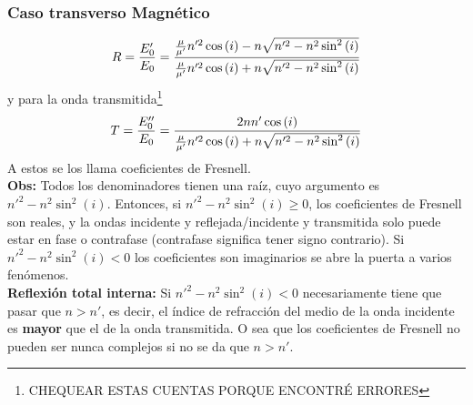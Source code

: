 \subsubsection*{Caso transverso Magnético}
\begin{equation}
    R 
    =
    \frac{E_{0}'}{E_{0}} 
    =
    \frac%
    {%
        \frac{\mu}{\mu'}n'^{2}\cos{(i)}
        -
        n\sqrt{n'^2- n^2 \sin^{2}{(i)}}
    }
    {%
        \frac{\mu}{\mu'}
        n'^{2}\cos{(i)}
        +
        n\sqrt{n'^{2} - n^{2} \sin^{2}{(i)}}
    }
        \label{ec:RTM}
\end{equation}
y para la onda transmitida\footnote{CHEQUEAR ESTAS CUENTAS PORQUE ENCONTRÉ ERRORES}
\begin{equation}
    T
    =
    \frac{E_{0}''}{E_{0}} 
    =
    \frac%
    {%
        2nn'\cos{(i)}
    }
    {%
        \frac{\mu}{\mu'}
        n'^{2}\cos{(i)}
        +
        n\sqrt{n'^{2} - n^{2} \sin^{2}{(i)}}
    }
        \label{ec:TTM}
\end{equation}
A estos se los llama coeficientes de Fresnell.\\
\indent \textbf{Obs:} Todos los denominadores tienen una raíz, cuyo argumento es $n'^{2} - n^{2}\sin^{2}{(i)}$. Entonces, si $n'^{2} - n^{2}\sin^{2}{(i)} \geq 0$, los coeficientes de Fresnell son reales, y la ondas incidente y reflejada/incidente y transmitida solo puede estar en fase o contrafase (contrafase significa tener signo contrario). Si $n'^{2} - n^{2}\sin^{2}{(i)} < 0$ los coeficientes son imaginarios se abre la puerta a varios fenómenos.\\
%
%
%
%
\indent \textbf{Reflexión total interna:} Si $n'^{2} - n^{2}\sin^{2}{(i)} < 0$ necesariamente tiene que pasar que $n > n'$, es decir, el índice de refracción del medio de la onda incidente es \textbf{mayor} que el de la onda transmitida. O sea que los coeficientes de Fresnell no pueden ser nunca complejos si no se da que $n > n'$.\\
